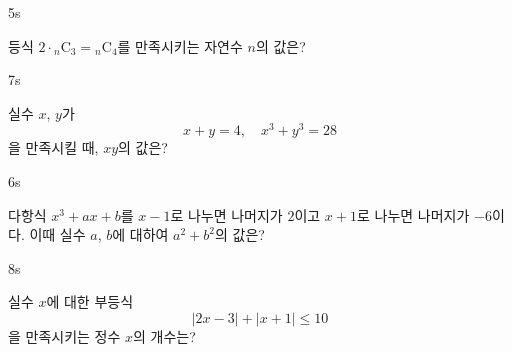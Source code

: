 \documentclass[10pt]{article}
\begin{document}
\setlength{\probboxheight}{100mm}

\begin{pagepair}
\noindent
\begin{minipage}[t][\probboxheight][t]{0.46\linewidth}
\begin{problem}{5}{s}
\par\smallskip
등식 $2 \cdot {}_n\mathrm{C}_3 = {}_n\mathrm{C}_4$를 만족시키는 자연수 $n$의 값은?
\begin{choices}
\end{choices}
\end{problem}
\end{minipage}\hfill
\begin{minipage}[t][\probboxheight][t]{0.46\linewidth}
\begin{problem}{7}{s}
\par\smallskip
실수 $x$, $y$가
\[ x + y = 4,\quad x^3 + y^3 = 28 \]
을 만족시킬 때, $xy$의 값은?
\begin{choices}
\end{choices}
\end{problem}
\end{minipage}
\par\vspace{4mm}
\noindent
\begin{minipage}[t][\probboxheight][t]{0.46\linewidth}
\begin{problem}{6}{s}
\par\smallskip
다항식 $x^3 + ax + b$를 $x - 1$로 나누면 나머지가 $2$이고 $x + 1$로 나누면 나머지가 $-6$이다. 이때 실수 $a$, $b$에 대하여 $a^2 + b^2$의 값은?
\begin{choices}
\end{choices}
\end{problem}
\end{minipage}\hfill
\begin{minipage}[t][\probboxheight][t]{0.46\linewidth}
\begin{problem}{8}{s}
\par\smallskip
실수 $x$에 대한 부등식
\[ |2x - 3| + |x + 1| \le 10 \]
을 만족시키는 정수 $x$의 개수는?
\begin{choices}
\end{choices}
\end{problem}
\end{minipage}
\end{pagepair}
\end{document}
